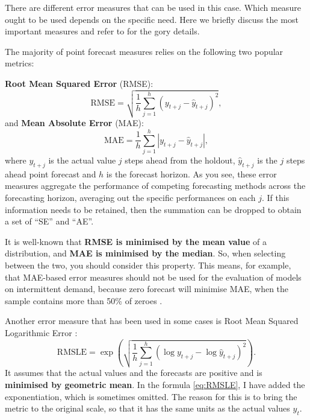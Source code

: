 \documentclass[
]{book}
\theoremstyle{definition}
\theoremstyle{definition}
\theoremstyle{definition}
\theoremstyle{definition}
\theoremstyle{remark}
\begin{document}
There are different error measures that can be used in this case. Which measure ought to be used depends on the specific need. Here we briefly discuss the most important measures and refer to \citep{Davydenko2013, SvetunkovAccuracy2019, SvetunkovAPEs2017} for the gory details.

The majority of point forecast measures relies on the following two popular metrics:

\textbf{Root Mean Squared Error} (RMSE):
\begin{equation}
    \mathrm{RMSE} = \sqrt{\frac{1}{h} \sum_{j=1}^h \left( y_{t+j} - \hat{y}_{t+j} \right)^2 },
    \label{eq:RMSE}
\end{equation}
and \textbf{Mean Absolute Error} (MAE):
\begin{equation}
    \mathrm{MAE} = \frac{1}{h} \sum_{j=1}^h \left| y_{t+j} - \hat{y}_{t+j} \right| ,
    \label{eq:MAE}
\end{equation}
where \(y_{t+j}\) is the actual value \(j\) steps ahead from the holdout, \(\hat{y}_{t+j}\) is the \(j\) steps ahead point forecast and \(h\) is the forecast horizon. As you see, these error measures aggregate the performance of competing forecasting methods across the forecasting horizon, averaging out the specific performances on each \(j\). If this information needs to be retained, then the summation can be dropped to obtain a set of ``SE'' and ``AE''.

It is well-known \citep[see, for example,][]{Kolassa2016} that \textbf{RMSE is minimised by the mean value} of a distribution, and \textbf{MAE is minimised by the median}. So, when selecting between the two, you should consider this property. This means, for example, that MAE-based error measures should not be used for the evaluation of models on intermittent demand, because zero forecast will minimise MAE, when the sample contains more than 50\% of zeroes \citep[see for example,][]{Wallstrom2010}.

Another error measure that has been used in some cases is Root Mean Squared Logarithmic Error \citep[RMSLE, see discussion in][]{Tofallis2015}:
\begin{equation}
    \mathrm{RMSLE} = \exp\left(\sqrt{\frac{1}{h} \sum_{j=1}^h \left( \log y_{t+j} - \log \hat{y}_{t+j} \right)^2} \right).
    \label{eq:RMSLE}
\end{equation}
It assumes that the actual values and the forecasts are positive and is \textbf{minimised by geometric mean}. In the formula \eqref{eq:RMSLE}, I have added the exponentiation, which is sometimes omitted. The reason for this is to bring the metric to the original scale, so that it has the same units as the actual values \(y_t\).
\end{document}
